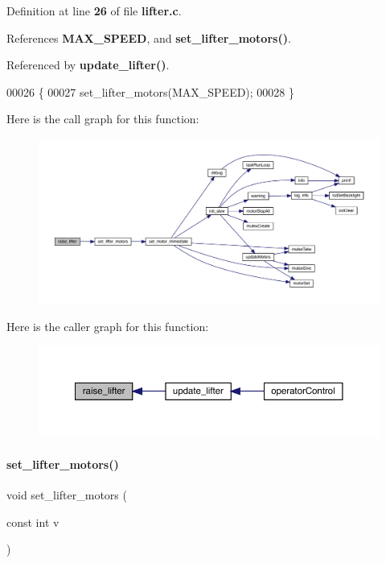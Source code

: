 Definition at line \textbf{ 26} of file \textbf{ lifter.\+c}.



References \textbf{ M\+A\+X\+\_\+\+S\+P\+E\+ED}, and \textbf{ set\+\_\+lifter\+\_\+motors()}.



Referenced by \textbf{ update\+\_\+lifter()}.


\begin{DoxyCode}
00026                    \{
00027   set_lifter_motors(MAX_SPEED);
00028 \}
\end{DoxyCode}
Here is the call graph for this function\+:\nopagebreak
\begin{figure}[H]
\begin{center}
\leavevmode
\includegraphics[width=350pt]{lifter_8c_a7452163ed7946b6262f41de51c62dfd4_cgraph}
\end{center}
\end{figure}
Here is the caller graph for this function\+:\nopagebreak
\begin{figure}[H]
\begin{center}
\leavevmode
\includegraphics[width=350pt]{lifter_8c_a7452163ed7946b6262f41de51c62dfd4_icgraph}
\end{center}
\end{figure}
\mbox{\label{lifter_8c_a2cfc188f60f945c824dd7fe7b0b5f4e4}} 
\paragraph{set\+\_\+lifter\+\_\+motors()}
{\footnotesize\ttfamily void set\+\_\+lifter\+\_\+motors (\begin{DoxyParamCaption}\item[{const int}]{v }\end{DoxyParamCaption})}



